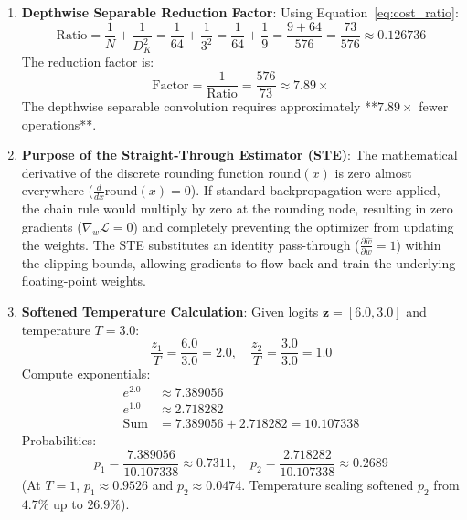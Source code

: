 \begin{enumerate}
    \item \textbf{Depthwise Separable Reduction Factor}:
    Using Equation~\eqref{eq:cost_ratio}:
    \begin{equation*}
    \text{Ratio} = \frac{1}{N} + \frac{1}{D_K^2} = \frac{1}{64} + \frac{1}{3^2} = \frac{1}{64} + \frac{1}{9} = \frac{9 + 64}{576} = \frac{73}{576} \approx 0.126736
    \end{equation*}
    The reduction factor is:
    \begin{equation*}
    \text{Factor} = \frac{1}{\text{Ratio}} = \frac{576}{73} \approx \mathbf{7.89\times}
    \end{equation*}
    The depthwise separable convolution requires approximately **$7.89\times$ fewer operations**.

    \item \textbf{Purpose of the Straight-Through Estimator (STE)}:
    The mathematical derivative of the discrete rounding function $\text{round}(x)$ is zero almost everywhere ($\frac{d}{dx} \text{round}(x) = 0$). If standard backpropagation were applied, the chain rule would multiply by zero at the rounding node, resulting in zero gradients ($\nabla_w \mathcal{L} = 0$) and completely preventing the optimizer from updating the weights. The STE substitutes an identity pass-through ($\frac{\partial \hat{w}}{\partial w} = 1$) within the clipping bounds, allowing gradients to flow back and train the underlying floating-point weights.

    \item \textbf{Softened Temperature Calculation}:
    Given logits $\mathbf{z} = [6.0, 3.0]$ and temperature $T = 3.0$:
    \begin{equation*}
    \frac{z_1}{T} = \frac{6.0}{3.0} = 2.0, \quad \frac{z_2}{T} = \frac{3.0}{3.0} = 1.0
    \end{equation*}
    Compute exponentials:
    \begin{align*}
    e^{2.0} &\approx 7.389056\\
    e^{1.0} &\approx 2.718282\\
    \text{Sum} &= 7.389056 + 2.718282 = 10.107338
    \end{align*}
    Probabilities:
    \begin{equation*}
    p_1 = \frac{7.389056}{10.107338} \approx \mathbf{0.7311}, \quad p_2 = \frac{2.718282}{10.107338} \approx \mathbf{0.2689}
    \end{equation*}
    (At $T=1$, $p_1 \approx 0.9526$ and $p_2 \approx 0.0474$. Temperature scaling softened $p_2$ from $4.7\%$ up to $26.9\%$).


\end{enumerate}
